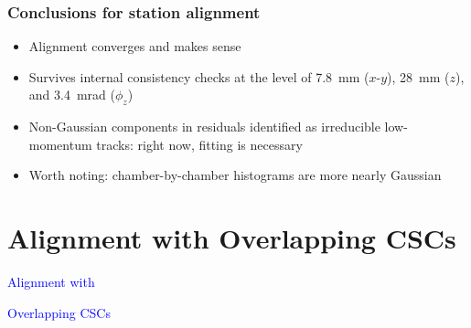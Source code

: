\documentclass[compress]{beamer}
\begin{document}
\begin{frame}
\frametitle{Conclusions for station alignment}
\begin{itemize}\setlength{\itemsep}{0.75 cm}
\item Alignment converges and makes sense

\item Survives internal consistency checks at the level of 7.8~mm
  ($x$-$y$), 28~mm ($z$), and 3.4~mrad ($\phi_z$)

\item Non-Gaussian components in residuals identified as irreducible
  low-momentum tracks: right now, fitting is necessary

\item Worth noting: chamber-by-chamber histograms are more nearly Gaussian

\end{itemize}
\end{frame}

\section*{Alignment with Overlapping CSCs}
\begin{frame}
\begin{center}
\Huge \textcolor{blue}{Alignment with}

\textcolor{blue}{Overlapping CSCs}
\end{center}
\end{frame}
\end{document}

